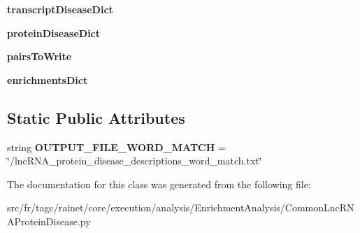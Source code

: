 \begin{DoxyCompactItemize}
\item 
\hypertarget{classsrc_1_1fr_1_1tagc_1_1rainet_1_1core_1_1execution_1_1analysis_1_1EnrichmentAnalysis_1_1Commocb4af204a9dc077e1a18361d5afc6b0c_ae9fbd1b3cf1253d61a1274e96e68f4c7}{{\bfseries transcript\-Disease\-Dict}}\label{classsrc_1_1fr_1_1tagc_1_1rainet_1_1core_1_1execution_1_1analysis_1_1EnrichmentAnalysis_1_1Commocb4af204a9dc077e1a18361d5afc6b0c_ae9fbd1b3cf1253d61a1274e96e68f4c7}

\item 
\hypertarget{classsrc_1_1fr_1_1tagc_1_1rainet_1_1core_1_1execution_1_1analysis_1_1EnrichmentAnalysis_1_1Commocb4af204a9dc077e1a18361d5afc6b0c_ae636f05346dd1d71ce14d56898b5422e}{{\bfseries protein\-Disease\-Dict}}\label{classsrc_1_1fr_1_1tagc_1_1rainet_1_1core_1_1execution_1_1analysis_1_1EnrichmentAnalysis_1_1Commocb4af204a9dc077e1a18361d5afc6b0c_ae636f05346dd1d71ce14d56898b5422e}

\item 
\hypertarget{classsrc_1_1fr_1_1tagc_1_1rainet_1_1core_1_1execution_1_1analysis_1_1EnrichmentAnalysis_1_1Commocb4af204a9dc077e1a18361d5afc6b0c_a4d97af453f561c1199da653139fd15bf}{{\bfseries pairs\-To\-Write}}\label{classsrc_1_1fr_1_1tagc_1_1rainet_1_1core_1_1execution_1_1analysis_1_1EnrichmentAnalysis_1_1Commocb4af204a9dc077e1a18361d5afc6b0c_a4d97af453f561c1199da653139fd15bf}

\item 
\hypertarget{classsrc_1_1fr_1_1tagc_1_1rainet_1_1core_1_1execution_1_1analysis_1_1EnrichmentAnalysis_1_1Commocb4af204a9dc077e1a18361d5afc6b0c_ae0ff0088feb1262f324ee2e9e0a326bb}{{\bfseries enrichments\-Dict}}\label{classsrc_1_1fr_1_1tagc_1_1rainet_1_1core_1_1execution_1_1analysis_1_1EnrichmentAnalysis_1_1Commocb4af204a9dc077e1a18361d5afc6b0c_ae0ff0088feb1262f324ee2e9e0a326bb}

\end{DoxyCompactItemize}
\subsection*{Static Public Attributes}
\begin{DoxyCompactItemize}
\item 
\hypertarget{classsrc_1_1fr_1_1tagc_1_1rainet_1_1core_1_1execution_1_1analysis_1_1EnrichmentAnalysis_1_1Commocb4af204a9dc077e1a18361d5afc6b0c_a72f2d2ec6b36f3ff0f37d098395c8924}{string {\bfseries O\-U\-T\-P\-U\-T\-\_\-\-F\-I\-L\-E\-\_\-\-W\-O\-R\-D\-\_\-\-M\-A\-T\-C\-H} = \char`\"{}/lnc\-R\-N\-A\-\_\-protein\-\_\-disease\-\_\-descriptions\-\_\-word\-\_\-match.\-txt\char`\"{}}\label{classsrc_1_1fr_1_1tagc_1_1rainet_1_1core_1_1execution_1_1analysis_1_1EnrichmentAnalysis_1_1Commocb4af204a9dc077e1a18361d5afc6b0c_a72f2d2ec6b36f3ff0f37d098395c8924}

\end{DoxyCompactItemize}


The documentation for this class was generated from the following file\-:\begin{DoxyCompactItemize}
\item 
src/fr/tagc/rainet/core/execution/analysis/\-Enrichment\-Analysis/Common\-Lnc\-R\-N\-A\-Protein\-Disease.\-py\end{DoxyCompactItemize}
